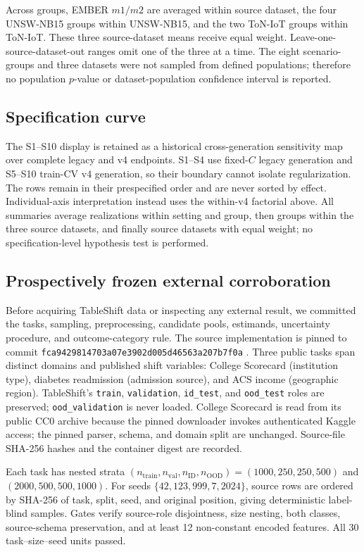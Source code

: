 \documentclass[referee,lineno,pdflatex,sn-nature]{sn-jnl}
\theoremstyle{thmstyleone}%
\theoremstyle{thmstyletwo}%
\theoremstyle{thmstylethree}%
\begin{document}
Across groups, EMBER $m1/m2$ are averaged within source dataset, the four UNSW-NB15 groups within UNSW-NB15, and the two ToN-IoT groups within ToN-IoT. These three source-dataset means receive equal weight. Leave-one-source-dataset-out ranges omit one of the three at a time. The eight scenario-groups and three datasets were not sampled from defined populations; therefore no population $p$-value or dataset-population confidence interval is reported.

\subsection{Specification curve}

The S1--S10 display is retained as a historical cross-generation sensitivity map over complete legacy and v4 endpoints. S1--S4 use fixed-$C$ legacy generation and S5--S10 train-CV v4 generation, so their boundary cannot isolate regularization. The rows remain in their prespecified order and are never sorted by effect. Individual-axis interpretation instead uses the within-v4 factorial above. All summaries average realizations within setting and group, then groups within the three source datasets, and finally source datasets with equal weight; no specification-level hypothesis test is performed.

\subsection{Prospectively frozen external corroboration}

Before acquiring TableShift data or inspecting any external result, we committed the tasks, sampling, preprocessing, candidate pools, estimands, uncertainty procedure, and outcome-category rule. The source implementation is pinned to commit \texttt{fca9429814703a07e3902d005d46563a207b7f0a} \cite{gardner2023tableshift}. Three public tasks span distinct domains and published shift variables: College Scorecard (institution type), diabetes readmission (admission source), and ACS income (geographic region). TableShift's \texttt{train}, \texttt{validation}, \texttt{id\_test}, and \texttt{ood\_test} roles are preserved; \texttt{ood\_validation} is never loaded. College Scorecard is read from its public CC0 archive because the pinned downloader invokes authenticated Kaggle access; the pinned parser, schema, and domain split are unchanged. Source-file SHA-256 hashes and the container digest are recorded.

Each task has nested strata $(n_{\mathrm{train}},n_{\mathrm{val}},n_{\mathrm{ID}},n_{\mathrm{OOD}})=(1000,250,250,500)$ and $(2000,500,500,1000)$. For seeds $\{42,123,999,7,2024\}$, source rows are ordered by SHA-256 of task, split, seed, and original position, giving deterministic label-blind samples. Gates verify source-role disjointness, size nesting, both classes, source-schema preservation, and at least 12 non-constant encoded features. All 30 task--size--seed units passed.
\end{document}
